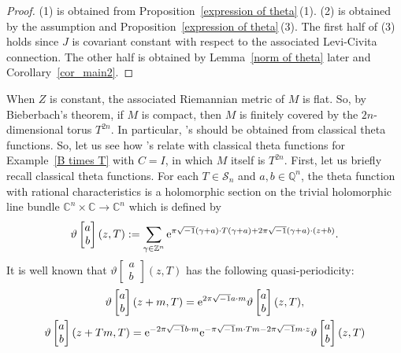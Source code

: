 \documentclass[pdftex]{sigma}
\numberwithin{equation}{section}
\newcommand{\C}{\mathbb{C}}
\newcommand{\Z}{\mathbb{Z}}
\newcommand{\Q}{\mathbb{Q}}
\begin{document}
\begin{proof}
(1) is obtained from Proposition~\ref{expression of theta}\,(1). (2) is obtained by the assumption and Proposition~\ref{expression of theta}\,(3). The first half of (3) holds since $J$ is covariant constant with respect to the associated Levi-Civita connection. The other half is obtained by Lemma~\ref{norm of theta} later and Corollary~\ref{cor_main2}.
\end{proof}

When $Z$ is constant, the associated Riemannian metric of $M$ is flat. So, by Bieberbach's theorem, if $M$ is compact, then $M$ is finitely covered by the $2n$-dimensional torus $T^{2n}$. In particular, 's should be obtained from classical theta functions. So, let us see how 's relate with classical theta functions for Example~\ref{B times T} with $C=I$, in which $M$ itself is $T^{2n}$. First, let us briefly recall classical theta functions. For each $T\in {\mathcal S}_n$ and $a, b\in \Q^n$, the theta function with rational characteristics is a holomorphic %
section on the trivial holomorphic line bundle $\C^n\times \C\to \C^n$ which is defined by
\[
\vartheta
\begin{bmatrix}
a \\
b
\end{bmatrix}
( z, T):=\sum_{\gamma \in \Z^n}{\rm e}^{\pi\sqrt{-1}(\gamma+a)\cdot T ( \gamma+a)+2\pi\sqrt{-1}( \gamma+a)\cdot ( z+b)} .
\]
It is well known that $\vartheta
\begin{bmatrix}
a \\
b
\end{bmatrix}
( z, T)$ has the following quasi-periodicity:
\begin{gather*}
\vartheta
\begin{bmatrix}
a \\
b
\end{bmatrix}
( z+m, T)={\rm e}^{2\pi\sqrt{-1}a\cdot m}
\vartheta
\begin{bmatrix}
a \\
b
\end{bmatrix}
( z, T) ,\\
\vartheta
\begin{bmatrix}
a \\
b
\end{bmatrix}
( z+Tm, T)={\rm e}^{-2\pi\sqrt{-1}b\cdot m}{\rm e}^{-\pi\sqrt{-1}m\cdot Tm-2\pi\sqrt{-1}m\cdot z}
\vartheta
\begin{bmatrix}
a \\
b
\end{bmatrix}
( z, T)
\end{gather*}
\end{document}
